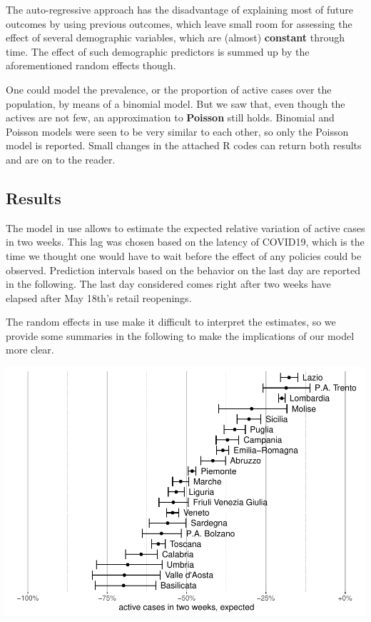 \documentclass[
  6pt,
]{article}
\begin{document}
The auto-regressive approach has the disadvantage of explaining most of
future outcomes by using previous outcomes, which leave small room for
assessing the effect of several demographic variables, which are
(almost) \textbf{constant} through time. The effect of such demographic
predictors is summed up by the aforementioned random effects though.

One could model the prevalence, or the proportion of active cases over
the population, by means of a binomial model. But we saw that, even
though the actives are not few, an approximation to \textbf{Poisson}
still holds. Binomial and Poisson models were seen to be very similar to
each other, so only the Poisson model is reported. Small changes in the
attached R codes can return both results and are on to the reader.

\hypertarget{results-1}{%
\subsection{Results}\label{results-1}}

The model in use allows to estimate the expected relative variation of
active cases in two weeks. This lag was chosen based on the latency of
COVID19, which is the time we thought one would have to wait before the
effect of any policies could be observed. Prediction intervals based on
the behavior on the last day are reported in the following. The last day
considered comes right after two weeks have elapsed after May 18th's
retail reopenings.

The random effects in use make it difficult to interpret the estimates,
so we provide some summaries in the following to make the implications
of our model more clear.

\begin{center}\includegraphics{Report_SC_Group3_files/figure-latex/unnamed-chunk-34-1} \end{center}
\end{document}
